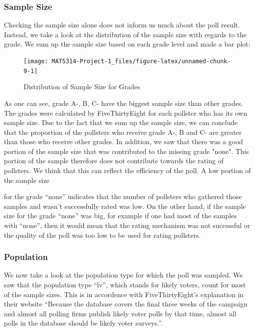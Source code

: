 \documentclass[
  11pt,
]{article}
\begin{document}
\hypertarget{sample-size}{%
\subsubsection{Sample Size}\label{sample-size}}

Checking the sample size alone does not inform us much about the poll
result. Instead, we take a look at the distribution of the sample size
with regards to the grade. We sum up the sample size based on each grade
level and made a bar plot:

\begin{minipage}[t]{0.55\textwidth}
\begin{figure}
\texttt{[image: MAT5314-Project-1\_files/figure-latex/unnamed-chunk-9-1]} \caption{Distribution of Sample Size for Grades}\label{fig:unnamed-chunk-9}
\end{figure}
\end{minipage}
\begin{minipage}[t]{0.45\textwidth}
\vspace{0pt}
As one can see, grade A-, B, C- have the biggest sample size than other grades. The grades were calculated by FiveThirtyEight for each pollster who has its own sample size. Due to the fact that we sum up the sample size, we can conclude that the proportion of the pollsters who receive grade A-, B and C- are greater than those who receive other grades. In addition, we saw that there was a good portion of the sample size that was contributed to the missing grade "none". This portion of the sample therefore does not contribute towards the rating of pollsters. We think that this can reflect the efficiency of the poll. A low portion of the sample size 
\end{minipage}

for the grade ``none'' indicates that the number of pollsters who
gathered those samples and wasn't successfully rated was low. On the
other hand, if the sample size for the grade ``none'' was big, for
example if one had most of the samples with ``none'', then it would mean
that the rating mechanism was not successful or the quality of the poll
was too low to be used for rating pollsters.

\hypertarget{population}{%
\subsubsection{Population}\label{population}}

We now take a look at the population type for which the poll was
sampled. We saw that the population type ``lv'', which stands for likely
voters, count for most of the sample sizes. This is in accordence with
FiveThirtyEight's explanation in their website ``Because the database
covers the final three weeks of the campaign and almost all polling
firms publish likely voter polls by that time, almost all polls in the
database should be likely voter surveys.''.
\end{document}
